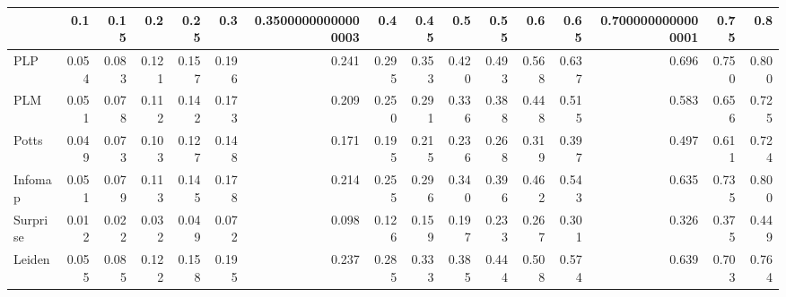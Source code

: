 \begin{tabular}{lrrrrrrrrrrrrrrr}
\toprule
{} &   0.1 &  0.15 &   0.2 &  0.25 &   0.3 & 0.35000000000000003 &   0.4 &  0.45 &   0.5 &  0.55 &   0.6 &  0.65 & 0.7000000000000001 &  0.75 &   0.8 \\
\midrule
PLP      & 0.054 & 0.083 & 0.121 & 0.157 & 0.196 &               0.241 & 0.295 & 0.353 & 0.420 & 0.493 & 0.568 & 0.637 &              0.696 & 0.750 & 0.800 \\
PLM      & 0.051 & 0.078 & 0.112 & 0.142 & 0.173 &               0.209 & 0.250 & 0.291 & 0.336 & 0.388 & 0.448 & 0.515 &              0.583 & 0.656 & 0.725 \\
Potts    & 0.049 & 0.073 & 0.103 & 0.127 & 0.148 &               0.171 & 0.195 & 0.215 & 0.236 & 0.268 & 0.319 & 0.397 &              0.497 & 0.611 & 0.724 \\
Infomap  & 0.051 & 0.079 & 0.113 & 0.145 & 0.178 &               0.214 & 0.255 & 0.296 & 0.340 & 0.396 & 0.462 & 0.543 &              0.635 & 0.735 & 0.800 \\
Surprise & 0.012 & 0.022 & 0.032 & 0.049 & 0.072 &               0.098 & 0.126 & 0.159 & 0.197 & 0.233 & 0.267 & 0.301 &              0.326 & 0.375 & 0.449 \\
Leiden   & 0.055 & 0.085 & 0.122 & 0.158 & 0.195 &               0.237 & 0.285 & 0.333 & 0.385 & 0.444 & 0.508 & 0.574 &              0.639 & 0.703 & 0.764 \\
\bottomrule
\end{tabular}
